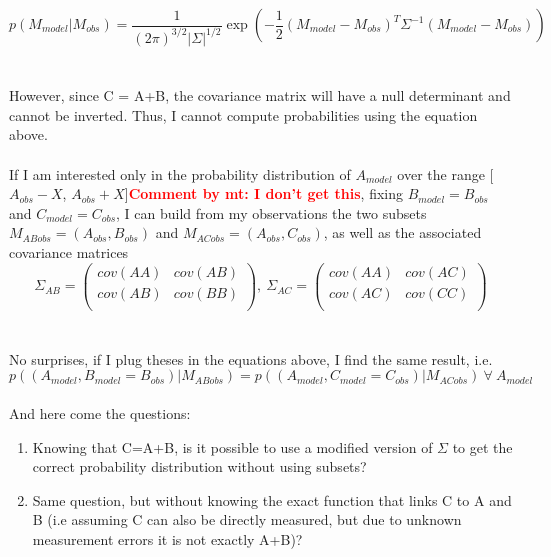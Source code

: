 \documentclass[11pt]{scrartcl}
\newcommand{\com}[2]{\xspace\textcolor{red}{\textbf{Comment by #1: #2}}}
\begin{document}
\begin{equation*}
p(M_{model} |M_{obs}) = \frac{1}{(2 \pi)^{3/2} 
|\Sigma|^{1/2}}\exp\left( -\frac{1}{2} 
(M_{model}-M_{obs})^T\Sigma^{-1}(M_{model}-M_{obs}) \right)
\end{equation*}
\\
\\
However, since C = A+B, the covariance matrix will have a null 
determinant and cannot be inverted. Thus, I cannot compute probabilities 
using the equation above.\\ 
\\
If I am interested only in the probability distribution of $A_{model}$ 
over the range [$A_{obs}-X$, $A_{obs}+X$]\com{mt}{I don't get this}, fixing $B_{model} = B_{obs}$ 
and $C_{model} = C_{obs}$, I can build from my observations the two 
subsets $M_{ABobs}=(A_{obs}, B_{obs})$ and $M_{ACobs} = (A_{obs}, 
C_{obs})$, as well as the associated covariance matrices
\begin{equation*}
\Sigma_{AB}=
  \begin{pmatrix}
    cov(AA) & cov(AB) \\
    cov(AB) & cov(BB) \\     
  \end{pmatrix}
,\ \Sigma_{AC}=
  \begin{pmatrix}
    cov(AA) & cov(AC) \\
    cov(AC) & cov(CC) \\   
  \end{pmatrix}  
\end{equation*}
\\
\\
No surprises, if I plug theses in the equations above, I find the 
same result, i.e.\\ $p((A_{model}, B_{model}=B_{obs})|M_{ABobs}) = 
p((A_{model}, C_{model}=C_{obs})|M_{ACobs})  \ \forall \ A_{model} $ \\
\\
And here come the questions:
\begin{enumerate}
 \item Knowing that C=A+B, is it possible to use a modified version of 
$\Sigma$ to get the correct probability distribution without using 
subsets?
 \item Same question, but without knowing the exact function that links 
C to A and B (i.e assuming C can also be directly measured, but due to 
unknown measurement errors it is not exactly A+B)?
 
\end{enumerate}
\end{document}
